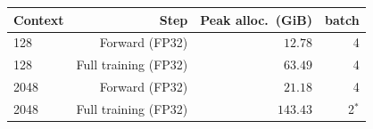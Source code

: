 \begin{tabular}{lrrr}
  \toprule
  Context & Step & Peak alloc.\ (GiB) & batch \\
  \midrule
  128 & Forward (FP32) & $12.78$ & 4 \\
  128 & Full training (FP32) & $63.49$ & 4 \\
  2048 & Forward (FP32) & $21.18$ & 4 \\
  2048 & Full training (FP32) & $143.43$ & 2$^*$ \\
  \bottomrule
\end{tabular}
